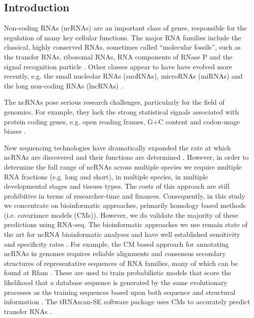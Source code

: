 \documentclass[10pt]{bmc_article}
\newenvironment{bmcformat}{\begin{raggedright}\baselineskip20pt\sloppy\setboolean{publ}{false}}{\end{raggedright}\baselineskip20pt\sloppy}
\begin{document}
\begin{bmcformat}

\section*{Introduction}

Non-coding RNAs (ncRNAs) are an important class of genes, responsible
for the regulation of many key cellular functions. The major RNA
families include the classical, highly conserved RNAs, sometimes
called ``molecular fossils'', such as the transfer RNAs, ribosomal
RNAs, RNA components of RNase P and the signal recognition particle
\cite{Jeffares:1998}. Other classes appear to have have evolved more
recently, e.g. the small nucleolar RNAs (snoRNAs), microRNAs (miRNAs)
and the long non-coding RNAs (lncRNAs) \cite{Hoeppner:2012}.


The ncRNAs pose serious research challenges, particularly for the
field of genomics. For example, they lack the strong statistical
signals associated with protein coding genes, e.g. open reading
frames, G+C content and codon-usage biases \cite{Rivas:2000}. 

New sequencing technologies have dramatically expanded the rate at
which ncRNAs are discovered and their functions are determined
\cite{cech2014noncoding}. However, in order to determine the full
range of ncRNAs across multiple species we require multiple RNA
fractions (e.g. long and short), in multiple species, in multiple
developmental stages and tissues types. The costs of this approach are
still prohibitive in terms of researcher-time and
finances. Consequently, in this study we concentrate on bioinformatic
approaches, primarily homology based methods (i.e. covariance models
(CMs)). However, we do validate the majority of these predictions
using RNA-seq. The bioinformatic approaches we use remain state of the art for ncRNA bioinformatic
analyses \cite{Sakakibara:1994,Eddy:1994,Nawrocki:2009} and have well
established sensitivity and specificity rates \cite{Freyhult:2007}.
For example, the CM based approach for annotating ncRNAs in genomes requires
reliable alignments and consensus secondary structures of
representative sequences of RNA families, many of which can be found
at Rfam
\cite{Griffiths-Jones:2003,Griffiths-Jones:2005,Gardner:2009,Gardner:2011a,Burge:2013}. These
are used to train probabilistic models that score the likelihood that
a database sequence is generated by the same evolutionary processes as
the training sequences based upon both sequence and structural
information \cite{Sakakibara:1994,Eddy:1994,Nawrocki:2009}.  The
tRNAscan-SE software package uses CMs to accurately predict transfer
RNAs \cite{Lowe:1997,Chan:2009}.


\end{bmcformat}
\end{document}
